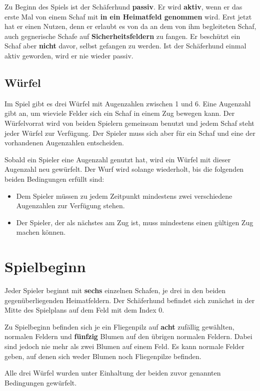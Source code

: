 \documentclass[11pt,pointlessnumbers,DIV10,BCOR10mm,tocleft]{scrreprt}
\begin{document}
Zu Beginn des Spiels ist der Schäferhund \textbf{passiv}. Er wird \textbf{aktiv}, wenn er das erste Mal von einem Schaf mit \textbf{in ein Heimatfeld genommen} wird. Erst jetzt hat er einen Nutzen, denn er erlaubt es von da an dem von ihm begleiteten Schaf, auch gegnerische Schafe auf \textbf{Sicherheitsfeldern} zu fangen. Er beschützt ein Schaf aber \textbf{nicht} davor, selbst gefangen zu werden. Ist der Schäferhund einmal aktiv geworden, wird er nie wieder passiv.

\subsection{Würfel}
Im Spiel gibt es drei Würfel mit Augenzahlen zwischen 1 und 6. Eine Augenzahl gibt an, um wieviele Felder sich ein Schaf in einem Zug bewegen kann. Der Würfelvorrat wird von beiden Spielern gemeinsam benutzt und jedem Schaf steht jeder Würfel zur Verfügung. Der Spieler muss sich aber für ein Schaf und eine der vorhandenen Augenzahlen entscheiden. 

Sobald ein Spieler eine Augenzahl genutzt hat, wird ein Würfel mit dieser Augenzahl neu gewürfelt. Der Wurf wird solange wiederholt, bis die folgenden beiden Bedingungen erfüllt sind:

\begin{itemize}
\item Dem Spieler müssen zu jedem Zeitpunkt mindestens zwei verschiedene Augenzahlen zur Verfügung stehen.
\item Der Spieler, der als nächstes am Zug ist, muss mindestens einen gültigen Zug machen können.
\end{itemize}
 
\section{Spielbeginn}
Jeder Spieler beginnt mit \textbf{sechs} einzelnen Schafen, je drei in den beiden gegenüberliegenden Heimatfeldern. Der Schäferhund befindet sich zunächst in der Mitte des Spielplans auf dem Feld mit dem Index 0.

Zu Spielbeginn befinden sich je ein Fliegenpilz auf \textbf{acht} zufällig gewählten, normalen Feldern und \textbf{fünfzig} Blumen auf den übrigen normalen Feldern. Dabei sind jedoch nie mehr als zwei Blumen auf einem Feld. Es kann normale Felder geben, auf denen sich weder Blumen noch Fliegenpilze befinden.

Alle drei Würfel wurden unter Einhaltung der beiden zuvor genannten Bedingungen gewürfelt.
\end{document}
